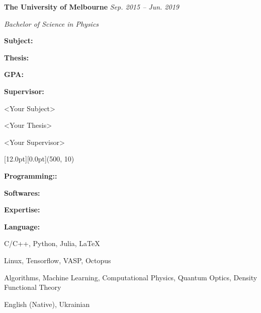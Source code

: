 \documentclass[12pt,a4paper]{report}
\begin{document}
    \begin{center}\begin{minipage}[t]{460pt}
        \textbf{The University of Melbourne}
        \hfill{\em{Sep. 2015 -- Jun. 2019}}\par
        \vspace{4pt}\quad\em{Bachelor of Science in Physics}
    \end{minipage}\end{center}
    \begin{center}
        \begin{minipage}[t]{125pt}
            \qquad \textbf{Subject:} \par
            \qquad \textbf{Thesis:} \par
            \qquad \textbf{GPA:} \par
            \qquad \textbf{Supervisor:} \par
        \end{minipage}
        \begin{minipage}[t]{375pt}
            \quad \textless Your Subject\textgreater \par
            \quad \textless Your Thesis\textgreater \par
             \par
            \quad \textless Your Supervisor\textgreater  \par
        \end{minipage}
    \end{center}
\begin{center}\begin{minipage}[t]{512pt}
    \colorbox{subtitlecolor}{\raisebox{0pt}[12.0pt][0.0pt]{\makebox(500, 10){
        \textcolor{white}{\ttfamily{}\selectfont{}}}}}\end{minipage}\end{center}
    \begin{center}
        \begin{minipage}[t]{125pt}
            \qquad \textbf{Programming::} \par
            \qquad \textbf{Softwares:} \par
            \qquad \textbf{Expertise:} \par
            \qquad \par
            \qquad \textbf{Language:} \par
        \end{minipage}
        \begin{minipage}[t]{375pt}
            C/C++, Python, Julia, \LaTeX \par
            Linux, Tensorflow, VASP, Octopus \par
            Algorithms, Machine Learning, Computational Physics, Quantum Optics, Density Functional Theory  \par
            English (Native), Ukrainian \par
        \end{minipage}
    \end{center}
\end{document}
